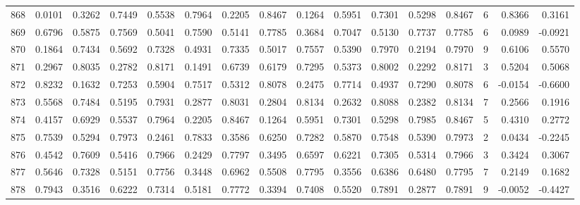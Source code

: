 \begin{tabular}{lrrrrrrrrrrrrrrr}
868 &      0.0101 &  0.3262 &  0.7449 &  0.5538 &  0.7964 &  0.2205 &  0.8467 &  0.1264 &  0.5951 &  0.7301 &   0.5298 &     0.8467 &      6 &                    0.8366 &                     0.3161 \\
869 &      0.6796 &  0.5875 &  0.7569 &  0.5041 &  0.7590 &  0.5141 &  0.7785 &  0.3684 &  0.7047 &  0.5130 &   0.7737 &     0.7785 &      6 &                    0.0989 &                    -0.0921 \\
870 &      0.1864 &  0.7434 &  0.5692 &  0.7328 &  0.4931 &  0.7335 &  0.5017 &  0.7557 &  0.5390 &  0.7970 &   0.2194 &     0.7970 &      9 &                    0.6106 &                     0.5570 \\
871 &      0.2967 &  0.8035 &  0.2782 &  0.8171 &  0.1491 &  0.6739 &  0.6179 &  0.7295 &  0.5373 &  0.8002 &   0.2292 &     0.8171 &      3 &                    0.5204 &                     0.5068 \\
872 &      0.8232 &  0.1632 &  0.7253 &  0.5904 &  0.7517 &  0.5312 &  0.8078 &  0.2475 &  0.7714 &  0.4937 &   0.7290 &     0.8078 &      6 &                   -0.0154 &                    -0.6600 \\
873 &      0.5568 &  0.7484 &  0.5195 &  0.7931 &  0.2877 &  0.8031 &  0.2804 &  0.8134 &  0.2632 &  0.8088 &   0.2382 &     0.8134 &      7 &                    0.2566 &                     0.1916 \\
874 &      0.4157 &  0.6929 &  0.5537 &  0.7964 &  0.2205 &  0.8467 &  0.1264 &  0.5951 &  0.7301 &  0.5298 &   0.7985 &     0.8467 &      5 &                    0.4310 &                     0.2772 \\
875 &      0.7539 &  0.5294 &  0.7973 &  0.2461 &  0.7833 &  0.3586 &  0.6250 &  0.7282 &  0.5870 &  0.7548 &   0.5390 &     0.7973 &      2 &                    0.0434 &                    -0.2245 \\
876 &      0.4542 &  0.7609 &  0.5416 &  0.7966 &  0.2429 &  0.7797 &  0.3495 &  0.6597 &  0.6221 &  0.7305 &   0.5314 &     0.7966 &      3 &                    0.3424 &                     0.3067 \\
877 &      0.5646 &  0.7328 &  0.5151 &  0.7756 &  0.3448 &  0.6962 &  0.5508 &  0.7795 &  0.3556 &  0.6386 &   0.6480 &     0.7795 &      7 &                    0.2149 &                     0.1682 \\
878 &      0.7943 &  0.3516 &  0.6222 &  0.7314 &  0.5181 &  0.7772 &  0.3394 &  0.7408 &  0.5520 &  0.7891 &   0.2877 &     0.7891 &      9 &                   -0.0052 &                    -0.4427 \\

\end{tabular}
